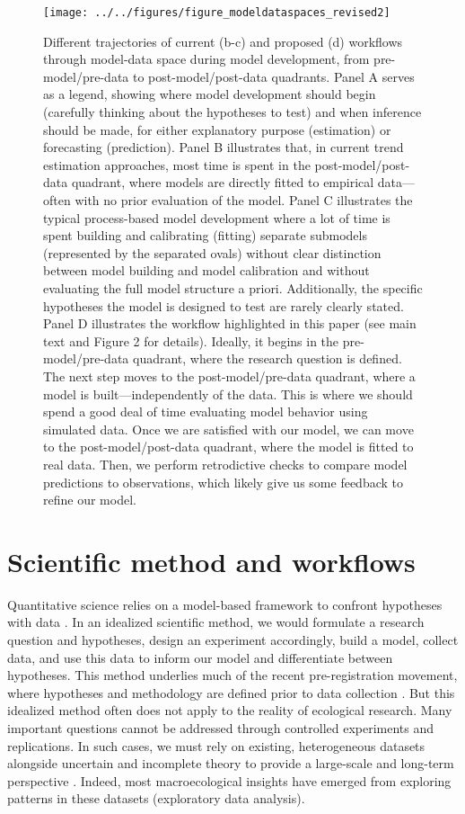\documentclass[11pt]{article}
\begin{document}
\begin{figure}
	\centering
	\texttt{[image: ../../figures/figure\_modeldataspaces\_revised2]}
	\caption{Different trajectories of current (b-c) and proposed (d) workflows through model-data space during model development, from pre-model/pre-data to post-model/post-data quadrants.
	Panel A serves as a legend, showing where model development should begin (carefully thinking about the hypotheses to test) and when inference should be made, for either explanatory purpose (estimation) or forecasting (prediction).
	Panel B illustrates that, in current trend estimation approaches, most time is spent in the post-model/post-data quadrant, where models are directly fitted to empirical data---often with no prior evaluation of the model.
	Panel C illustrates the typical process-based model development where a lot of time is spent building and calibrating (fitting) separate submodels (represented by the separated ovals) without clear distinction between model building and model calibration and without evaluating the full model structure a priori. Additionally, the specific hypotheses the model is designed to test are rarely clearly stated.
	Panel D illustrates the workflow highlighted in this paper (see main text and Figure 2 for details). Ideally, it begins in the pre-model/pre-data quadrant, where the research question is defined. The next step moves to the post-model/pre-data quadrant, where a model is built---independently of the data. This is where we should spend a good deal of time evaluating model behavior using simulated data. Once we are satisfied with our model, we can move to the post-model/post-data quadrant, where the model is fitted to real data. Then, we perform retrodictive checks to compare model predictions to observations, which likely give us some feedback to refine our model.}
	\label{fig:modeldata}
\end{figure}

\section{Scientific method and workflows}

Quantitative science relies on a model-based framework to confront hypotheses with data \citep{Chamberlin:1965cd}. In an idealized scientific method, we would formulate a research question and hypotheses, design an experiment accordingly, build a model, collect data, and use this data to inform our model and differentiate between hypotheses. This method underlies much of the recent pre-registration movement, where hypotheses and methodology are defined prior to data collection \citep{Nosek2018}.
But this idealized method often does not apply to the reality of ecological research. Many important questions cannot be addressed through controlled experiments and replications. In such cases, we must rely on existing, heterogeneous datasets alongside uncertain and incomplete theory to provide a large-scale and long-term perspective \citep{Hilborn1997}. Indeed, most macroecological insights have emerged from exploring patterns in these datasets (exploratory data analysis).
\end{document}
